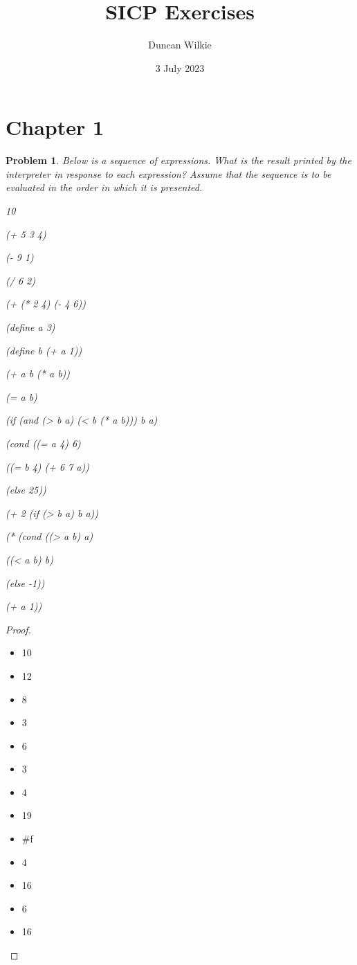 \documentclass{article}
\title{SICP Exercises}
\author{Duncan Wilkie}
\date{3 July 2023}
\newtheorem{plm}{Problem}
\begin{document}
\maketitle

\section{Chapter 1}

\begin{plm}
  Below is a sequence of expressions.
  What is the result printed by the interpreter in response to each expression?
  Assume that the sequence is to be evaluated in the order in which it is presented.
  \begin{verb}

    10

    (+ 5 3 4)

    (- 9 1)

    (/ 6 2)

    (+ (* 2 4) (- 4 6))

    (define a 3)

    (define b (+ a 1))

    (+ a b (* a b))

    (= a b)

    (if (and (> b a) (< b (* a b)))
             b
             a)

    (cond ((= a 4) 6)

          ((= b 4) (+ 6 7 a))

          (else 25))

    (+ 2 (if (> b a) b a))

    (* (cond ((> a b) a)

             ((< a b) b)

             (else -1))

       (+ a 1))
  \end{verb}
\end{plm}

\begin{proof} \;
  \begin{itemize}
  \item 10
  \item 12
  \item 8
  \item 3
  \item 6
  \item 3
  \item 4
  \item 19
  \item \#f
  \item 4
  \item 16
  \item 6
  \item 16
  \end{itemize}
\end{proof}
\end{document}
